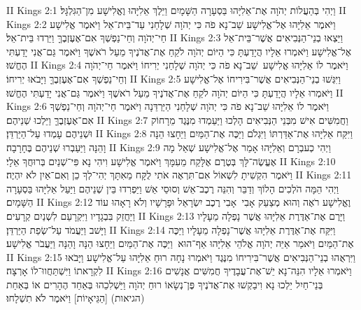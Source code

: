 II Kings 2:1	וַיְהִי בְּהַעֲלוֹת יְהֹוָה אֶת־אֵלִיָּהוּ בַּסְעָרָה הַשָּׁמָיִם וַיֵּלֶךְ אֵלִיָּהוּ וֶאֱלִישָׁע מִן־הַגִּלְגָּל׃
II Kings 2:2	וַיֹּאמֶר אֵלִיָּהוּ אֶל־אֱלִישָׁע שֵׁב־נָא פֹה כִּי יְהֹוָה שְׁלָחַנִי עַד־בֵּית־אֵל וַיֹּאמֶר אֱלִישָׁע חַי־יְהֹוָה וְחֵי־נַפְשְׁךָ אִם־אֶעֶזְבֶךָּ וַיֵּרְדוּ בֵּית־אֵל׃
II Kings 2:3	וַיֵּצְאוּ בְנֵי־הַנְּבִיאִים אֲשֶׁר־בֵּית־אֵל אֶל־אֱלִישָׁע וַיֹּאמְרוּ אֵלָיו הֲיָדַעְתָּ כִּי הַיּוֹם יְהֹוָה לֹקֵחַ אֶת־אֲדֹנֶיךָ מֵעַל רֹאשֶׁךָ וַיֹּאמֶר גַּם־אֲנִי יָדַעְתִּי הֶחֱשׁוּ׃
II Kings 2:4	וַיֹּאמֶר לוֹ אֵלִיָּהוּ אֱלִישָׁע  שֵׁב־נָא פֹה כִּי יְהֹוָה שְׁלָחַנִי יְרִיחוֹ וַיֹּאמֶר חַי־יְהֹוָה וְחֵי־נַפְשְׁךָ אִם־אֶעֶזְבֶךָּ וַיָּבֹאוּ יְרִיחוֹ׃
II Kings 2:5	וַיִּגְּשׁוּ בְנֵי־הַנְּבִיאִים אֲשֶׁר־בִּירִיחוֹ אֶל־אֱלִישָׁע וַיֹּאמְרוּ אֵלָיו הֲיָדַעְתָּ כִּי הַיּוֹם יְהֹוָה לֹקֵחַ אֶת־אֲדֹנֶיךָ מֵעַל רֹאשֶׁךָ וַיֹּאמֶר גַּם־אֲנִי יָדַעְתִּי הֶחֱשׁוּ׃
II Kings 2:6	וַיֹּאמֶר לוֹ אֵלִיָּהוּ שֵׁב־נָא פֹה כִּי יְהֹוָה שְׁלָחַנִי הַיַּרְדֵּנָה וַיֹּאמֶר חַי־יְהֹוָה וְחֵי־נַפְשְׁךָ אִם־אֶעֶזְבֶךָּ וַיֵּלְכוּ שְׁנֵיהֶם׃
II Kings 2:7	וַחֲמִשִּׁים אִישׁ מִבְּנֵי הַנְּבִיאִים הָלְכוּ וַיַּעַמְדוּ מִנֶּגֶד מֵרָחוֹק וּשְׁנֵיהֶם עָמְדוּ עַל־הַיַּרְדֵּן׃
II Kings 2:8	וַיִּקַּח אֵלִיָּהוּ אֶת־אַדַּרְתּוֹ וַיִּגְלֹם וַיַּכֶּה אֶת־הַמַּיִם וַיֵּחָצוּ הֵנָּה וָהֵנָּה וַיַּעַבְרוּ שְׁנֵיהֶם בֶּחָרָבָה׃
II Kings 2:9	וַיְהִי כְעבְרָם וְאֵלִיָּהוּ אָמַר אֶל־אֱלִישָׁע שְׁאַל מָה אֶעֱשֶׂה־לָּךְ בְּטֶרֶם אֶלָּקַח מֵעִמָּךְ וַיֹּאמֶר אֱלִישָׁע וִיהִי נָא פִּי־שְׁנַיִם בְּרוּחֲךָ אֵלָי׃
II Kings 2:10	וַיֹּאמֶר הִקְשִׁיתָ לִשְׁאוֹל אִם־תִּרְאֶה אֹתִי לֻקָּח מֵאִתָּךְ יְהִי־לְךָ כֵן וְאִם־אַיִן לֹא יִהְיֶה׃
II Kings 2:11	וַיְהִי הֵמָּה הֹלְכִים הָלוֹךְ וְדַבֵּר וְהִנֵּה רֶכֶב־אֵשׁ וְסוּסֵי אֵשׁ וַיַּפְרִדוּ בֵּין שְׁנֵיהֶם וַיַּעַל אֵלִיָּהוּ בַּסְעָרָה הַשָּׁמָיִם׃
II Kings 2:12	וֶאֱלִישָׁע רֹאֶה וְהוּא מְצַעֵק אָבִי  אָבִי רֶכֶב יִשְׂרָאֵל וּפָרָשָׁיו וְלֹא רָאָהוּ עוֹד וַיַּחֲזֵק בִּבְגָדָיו וַיִּקְרָעֵם לִשְׁנַיִם קְרָעִים׃
II Kings 2:13	וַיָּרֶם אֶת־אַדֶּרֶת אֵלִיָּהוּ אֲשֶׁר נָפְלָה מֵעָלָיו וַיָּשׁב וַיַּעֲמֹד עַל־שְׂפַת הַיַּרְדֵּן׃
II Kings 2:14	וַיִּקַּח אֶת־אַדֶּרֶת אֵלִיָּהוּ אֲשֶׁר־נָפְלָה מֵעָלָיו וַיַּכֶּה אֶת־הַמַּיִם וַיֹּאמַר אַיֵּה יְהֹוָה אֱלֹהֵי אֵלִיָּהוּ אַף־הוּא  וַיַּכֶּה אֶת־הַמַּיִם וַיֵּחָצוּ הֵנָּה וָהֵנָּה וַיַּעֲבֹר אֱלִישָׁע׃
II Kings 2:15	וַיִּרְאֻהוּ בְנֵי־הַנְּבִיאִים אֲשֶׁר־בִּירִיחוֹ מִנֶּגֶד וַיֹּאמְרוּ נָחָה רוּחַ אֵלִיָּהוּ עַל־אֱלִישָׁע וַיָּבֹאוּ לִקְרָאתוֹ וַיִּשְׁתַּחֲווּ־לוֹ אָרְצָה׃
II Kings 2:16	וַיֹּאמְרוּ אֵלָיו הִנֵּה־נָא יֵשׁ־אֶת־עֲבָדֶיךָ חֲמִשִּׁים אֲנָשִׁים בְּנֵי־חַיִל יֵלְכוּ נָא וִיבַקְשׁוּ אֶת־אֲדֹנֶיךָ פֶּן־נְשָׂאוֹ רוּחַ יְהֹוָה וַיַּשְׁלִכֵהוּ בְּאַחַד הֶהָרִים אוֹ בְּאַחַת (הגיאות) [הַגֵּיאָיוֹת] וַיֹּאמֶר לֹא תִשְׁלָחוּ׃

